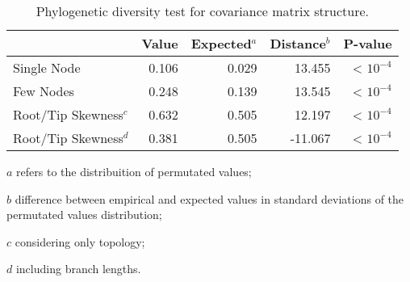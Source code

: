 \begin{table}[ht]
  \centering
  \begin{threeparttable}
  \caption{Phylogenetic diversity test for covariance matrix structure. \label{tab:riem_decdiv}}
  \begin{tabular}{lrrrr}
    \toprule
    & \textbf{Value} & \textbf{Expected$^a$} & \textbf{Distance$^b$} & \textbf{P-value} \\ 
    \midrule
    Single Node & 0.106 & 0.029 & 13.455 & < $10^{-4}$ \\ 
    Few Nodes & 0.248 & 0.139 & 13.545 & < $10^{-4}$ \\ 
    Root/Tip Skewness$^c$ & 0.632 & 0.505 & 12.197 & < $10^{-4}$ \\ 
    Root/Tip Skewness$^d$ & 0.381 & 0.505 & -11.067 & < $10^{-4}$ \\ 
    \bottomrule
  \end{tabular}
  \begin{tablenotes}
    \footnotesize
    {
    \item[$a$] refers to the distribuition of permutated values;
    \item[$b$] difference between empirical and expected values in standard deviations of the permutated values distribution;
    \item[$c$] considering only topology;
    \item[$d$] including branch lengths.
    }
  \end{tablenotes}
\end{threeparttable}
\end{table}
